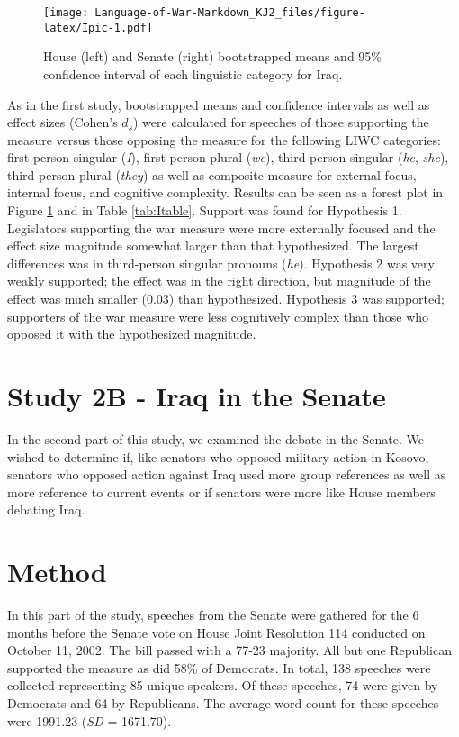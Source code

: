 \documentclass[jou,a4paper]{apa6}
\begin{document}
\begin{figure}
\centering
\texttt{[image: Language-of-War-Markdown\_KJ2\_files/figure-latex/Ipic-1.pdf]}
\caption{\label{fig:Ipic}House (left) and Senate (right) bootstrapped means and 95\% confidence interval of each linguistic category for Iraq.}
\end{figure}

As in the first study, bootstrapped means and confidence intervals as well as effect sizes (Cohen's \(d_s\)) were calculated for speeches of those supporting the measure versus those opposing the measure for the following LIWC categories: first-person singular (\emph{I}), first-person plural (\emph{we}), third-person singular (\emph{he}, \emph{she}), third-person plural (\emph{they}) as well as composite measure for external focus, internal focus, and cognitive complexity. Results can be seen as a forest plot in Figure \ref{fig:Ipic} and in Table \ref{tab:Itable}. Support was found for Hypothesis 1. Legislators supporting the war measure were more externally focused and the effect size magnitude somewhat larger than that hypothesized. The largest differences was in third-person singular pronouns (\emph{he}). Hypothesis 2 was very weakly supported; the effect was in the right direction, but magnitude of the effect was much smaller (0.03) than hypothesized. Hypothesis 3 was supported; supporters of the war measure were less cognitively complex than those who opposed it with the hypothesized magnitude.


\section{Study 2B - Iraq in the Senate}

In the second part of this study, we examined the debate in the Senate. We wished to determine if, like senators who opposed military action in Kosovo, senators who opposed action against Iraq used more group references as well as more reference to current events or if senators were more like House members debating Iraq.

\section{Method}

In this part of the study, speeches from the Senate were gathered for the 6 months before the Senate vote on House Joint Resolution 114 conducted on October 11, 2002. The bill passed with a 77-23 majority. All but one Republican supported the measure as did 58\% of Democrats. In total, 138 speeches were collected representing 85 unique speakers. Of these speeches, 74 were given by Democrats and 64 by Republicans. The average word count for these speeches were 1991.23 (\emph{SD} = 1671.70).
\end{document}
